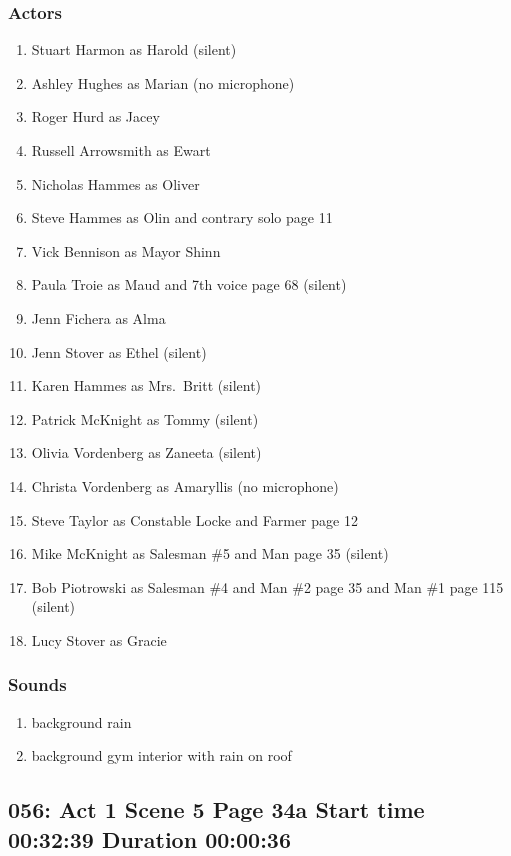 \subsubsection{Actors}
\begin{enumerate}
\item Stuart Harmon as Harold (silent)
\item Ashley Hughes as Marian (no microphone)
\item Roger Hurd as Jacey
\item Russell Arrowsmith as Ewart
\item Nicholas Hammes as Oliver
\item Steve Hammes as Olin and contrary solo page 11
\item Vick Bennison as Mayor Shinn
\item Paula Troie as Maud and 7th voice page 68 (silent)
\item Jenn Fichera as Alma
\item Jenn Stover as Ethel (silent)
\item Karen Hammes as Mrs.~Britt (silent)
\item Patrick McKnight as Tommy (silent)
\item Olivia Vordenberg as Zaneeta (silent)
\item Christa Vordenberg as Amaryllis (no microphone)
\item Steve Taylor as Constable Locke and Farmer page 12
\item Mike McKnight as Salesman \#5 and Man page 35 (silent)
\item Bob Piotrowski as Salesman \#4 and Man \#2 page 35 and Man \#1 page 115 (silent)
\item Lucy Stover as Gracie
\end{enumerate}

\subsubsection{Sounds}
\begin{enumerate}
\item background rain
\item background gym interior with rain on roof
\end{enumerate}
\subsection{056: Act 1 Scene 5 Page 34a Start time 00:32:39 Duration 00:00:36}

